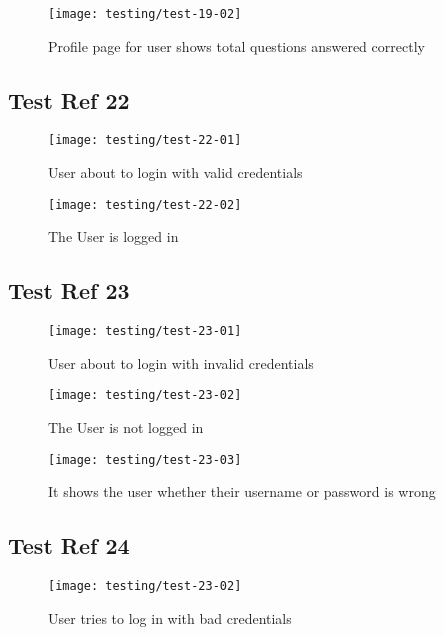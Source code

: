 \begin{figure}[H]
\centering
\texttt{[image: testing/test-19-02]}
\caption{Profile page for user shows total questions answered correctly}
\label{test-21-01}
\end{figure}

\subsection{Test Ref 22}

\begin{figure}[H]
\centering
\texttt{[image: testing/test-22-01]}
\caption{User about to login with valid credentials}
\label{test-22-01}
\end{figure}

\begin{figure}[H]
\centering
\texttt{[image: testing/test-22-02]}
\caption{The User is logged in}
\label{test-22-02}
\end{figure}

\subsection{Test Ref 23}

\begin{figure}[H]
\centering
\texttt{[image: testing/test-23-01]}
\caption{User about to login with invalid credentials}
\label{test-23-01}
\end{figure}

\begin{figure}[H]
\centering
\texttt{[image: testing/test-23-02]}
\caption{The User is not logged in}
\label{test-23-02}
\end{figure}

\begin{figure}[H]
\centering
\texttt{[image: testing/test-23-03]}
\caption{It shows the user whether their username or password is wrong}
\label{test-23-03}
\end{figure}

\subsection{Test Ref 24}

\begin{figure}[H]
\centering
\texttt{[image: testing/test-23-02]}
\caption{User tries to log in with bad credentials}
\label{test-24-01}
\end{figure}

